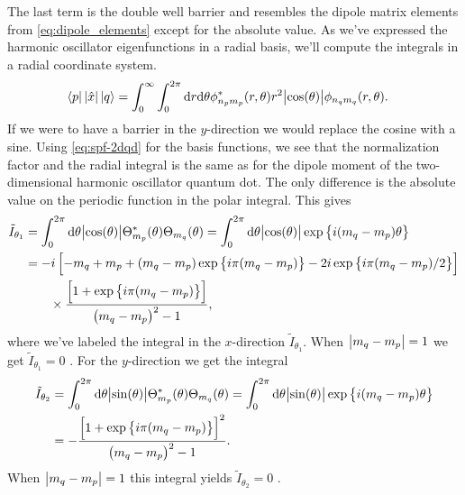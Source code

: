         The last term is the double well barrier and resembles the dipole matrix
        elements from \autoref{eq:dipole_elements} except for the absolute
        value.
        As we've expressed the harmonic oscillator eigenfunctions in a radial
        basis, we'll compute the integrals in a radial coordinate system.
        \begin{align}
            \bra{p}\abs{\hat{x}}\ket{q}
            &=
            \int_{0}^{\infty}\int_{0}^{2\pi}
            \dd r \dd\theta
            \phi_{n_p m_p}^{*}(r, \theta)
            r^2\abs{\cos(\theta)}
            \phi_{n_q m_q}(r, \theta).
        \end{align}
        If we were to have a barrier in the $y$-direction we would replace the
        cosine with a sine.
        Using \autoref{eq:spf-2dqd} for the basis functions, we see that the
        normalization factor and the radial integral is the same as for the
        dipole moment of the two-dimensional harmonic oscillator quantum dot.
        The only difference is the absolute value on the periodic function in
        the polar integral.
        This gives \cite{wolframalphatildei1}
        \begin{align}
            \tilde{I}_{\theta_1}
            &=
            \int_{0}^{2\pi}\dd \theta \abs{\cos(\theta)}
            \Theta_{m_p}^{*}(\theta)
            \Theta_{m_q}(\theta)
            =
            \int_{0}^{2\pi}\dd \theta \abs{\cos(\theta)}
            \exp\left\{ i(m_q - m_p)\theta \right\}
            \\
            &=
            -i\left[ 
                -m_q + m_p
                + (m_q - m_p)\exp\left\{ i\pi(m_q - m_p) \right\}
                - 2i\exp\left\{ 
                    i\pi(m_q - m_p)/2
                 \right\}
             \right]
            \\
            &\qquad
            \times
            \frac{
                \left[ 
                    1 + \exp\left\{ i\pi(m_q - m_p) \right\}
                 \right]
            }{
                \left( m_q - m_p \right)^2 - 1
            },
        \end{align}
        where we've labeled the integral in the $x$-direction
        $\tilde{I}_{\theta_1}$.
        When $\abs{m_q - m_p} = 1$ we get $\tilde{I}_{\theta_1} = 0$
        \cite{wolframalphatildei1-zero}.
        For the $y$-direction we get the integral \cite{wolframalphatildei2}
        \begin{align}
            \tilde{I}_{\theta_2}
            &=
            \int_{0}^{2\pi}\dd \theta \abs{\sin(\theta)}
            \Theta_{m_p}^{*}(\theta)
            \Theta_{m_q}(\theta)
            =
            \int_{0}^{2\pi}\dd \theta \abs{\sin(\theta)}
            \exp\left\{ i(m_q - m_p)\theta \right\}
            \\
            &=
            -\frac{
                \left[ 
                    1 + \exp\left\{ i \pi (m_q - m_p) \right\}
                 \right]^2
            }{
                \left( m_q - m_p \right)^2 - 1
            }.
        \end{align}
        When $\abs{m_q - m_p} = 1$ this integral yields $\tilde{I}_{\theta_2} =
        0$ \cite{wolframalphatildei2-zero}.

